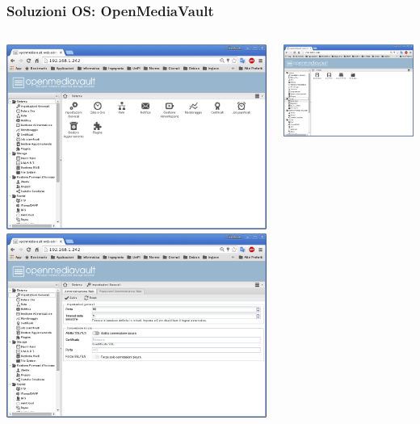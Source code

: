 \documentclass[11pt,xcolor=table]{beamer}
\begin{document}
\begin{frame}
	\frametitle{Soluzioni OS: OpenMediaVault}
	\begin{columns}
		\begin{column}{0.48\textwidth}
			\includegraphics[width=\textwidth]{OMV/OMV1.png}
			\vspace{1mm}
			\includegraphics[width=\textwidth]{OMV/OMV3.png}
		\end{column}
		\begin{column}{0.48\textwidth}
			\includegraphics[width=\textwidth]{OMV/OMV4.png}

\end{column}
\end{columns}
\end{frame}
\end{document}
